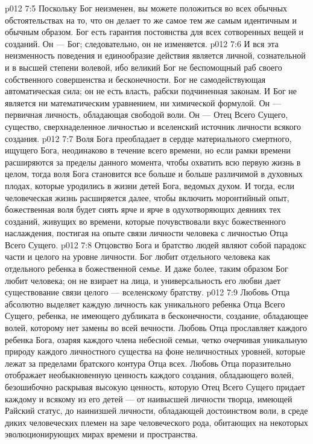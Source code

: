\vs p012 7:5 Поскольку Бог неизменен, вы можете положиться во всех обычных обстоятельствах на то, что он делает то же самое тем же самым идентичным и обычным образом. Бог есть гарантия постоянства для всех сотворенных вещей и созданий. Он --- Бог; следовательно, он не изменяется.
\vs p012 7:6 И вся эта неизменность поведения и единообразие действия является личной, сознательной и в высшей степени волевой, ибо великий Бог не беспомощный раб своего собственного совершенства и бесконечности. Бог не самодействующая автоматическая сила; он не есть власть, рабски подчиненная законам. И Бог не является ни математическим уравнением, ни химической формулой. Он --- первичная личность, обладающая свободой воли. Он --- Отец Всего Сущего, существо, сверхнаделенное личностью и вселенский источник личности всякого создания.
\vs p012 7:7 \pc Воля Бога преобладает в сердце материального смертного, ищущего Бога, неодинаково в течение всего времени, но если рамки времени расширяются за пределы данного момента, чтобы охватить всю первую жизнь в целом, тогда воля Бога становится все больше и больше различимой в духовных плодах, которые уродились в жизни детей Бога, ведомых духом. И тогда, если человеческая жизнь расширяется далее, чтобы включить моронтийный опыт, божественная воля будет сиять ярче и ярче в одухотворяющих деяниях тех созданий, живущих во времени, которые почувствовали вкус божественного наслаждения, постигая на опыте связи личности человека с личностью Отца Всего Сущего.
\vs p012 7:8 Отцовство Бога и братство людей являют собой парадокс части и целого на уровне личности. Бог любит  отдельного человека как отдельного ребенка в божественной семье. И даже более, таким образом Бог любит  человека; он не взирает на лица, и универсальность его любви дает существование связи целого --- вселенскому братству.
\vs p012 7:9 Любовь Отца абсолютно выделяет каждую личность как уникального ребенка Отца Всего Сущего, ребенка, не имеющего дубликата в бесконечности, создание, обладающее волей, которому нет замены во всей вечности. Любовь Отца прославляет каждого ребенка Бога, озаряя каждого члена небесной семьи, четко очерчивая уникальную природу каждого личностного существа на фоне неличностных уровней, которые лежат за пределами братского контура Отца всех. Любовь Отца поразительно отображает необыкновенную ценность каждого создания, обладающего волей, безошибочно раскрывая высокую ценность, которую Отец Всего Сущего придает каждому и всякому из его детей --- от наивысшей личности творца, имеющей Райский статус, до наинизшей личности, обладающей достоинством воли, в среде диких человеческих племен на заре человеческого рода, обитающих на некоторых эволюционирующих мирах времени и пространства.
